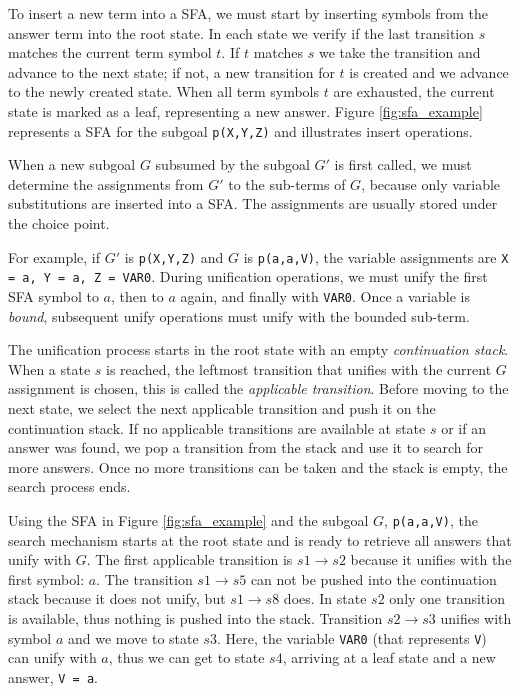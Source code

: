 To insert a new term into a SFA, we must start by inserting symbols from the answer term into the root state.
In each state we verify if the last transition $s$ matches the current term symbol $t$. If $t$ matches $s$
we take the transition and advance to the next state; if not, a new transition for $t$ is created and we advance
to the newly created state. When all term symbols $t$ are exhausted, the current state is marked as a leaf,
representing a new answer.
Figure \ref{fig:sfa_example} represents a SFA for the subgoal \texttt{p(X,Y,Z)} and
illustrates insert operations.

When a new subgoal $G$ subsumed by the subgoal $G'$ is first called, we must determine the assignments
from $G'$ to the sub-terms of $G$, because only variable substitutions are inserted into a SFA.
The assignments are usually stored under the choice point.

For example, if $G'$ is \texttt{p(X,Y,Z)} and $G$ is \texttt{p(a,a,V)}, the variable assignments
are \texttt{X = a, Y = a, Z = VAR0}. During unification operations, we must unify the first SFA symbol
to $a$, then to $a$ again, and finally with \texttt{VAR0}.
Once a variable is \textit{bound}, subsequent unify operations must unify with the bounded sub-term.

The unification process starts in the root state with an empty \textit{continuation stack}.
When a state $s$ is reached, the leftmost transition that unifies with the current $G$ assignment is chosen,
this is called the \textit{applicable transition}.
Before moving to the next state, we select the next applicable transition and push it on the continuation stack.
If no applicable transitions are available at state $s$ or if an answer was found, we pop a transition from
the stack and use it to search for more answers. Once no more transitions can be taken and the stack is empty, the
search process ends.

Using the SFA in Figure \ref{fig:sfa_example} and the subgoal $G$, \texttt{p(a,a,V)}, the search mechanism starts
at the root state and is ready to retrieve all answers that unify with $G$.
The first applicable transition is $s1 \rightarrow s2$ because it unifies with the first symbol: $a$. The transition
$s1 \rightarrow s5$ can not be pushed into the continuation stack because it does not unify, but $s1 \rightarrow s8$ does.
In state $s2$ only one transition is available, thus nothing is pushed into the stack.
Transition $s2 \rightarrow s3$ unifies with symbol $a$ and we move to state $s3$. Here, the variable \texttt{VAR0} (that represents \texttt{V})
can unify with $a$, thus we can get to state $s4$, arriving at a leaf state and a new answer, \texttt{V = a}.

